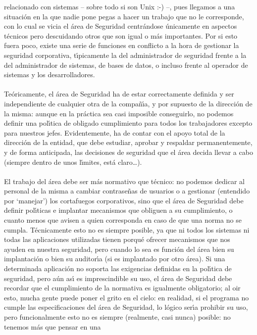 relacionado con sistemas -- sobre todo si son Unix :-) --, pues llegamos a una
situaci\'on en la que nadie pone pegas a hacer un trabajo que no le corresponde,
con lo cual se vicia el \'area de Seguridad centr\'andose \'unicamente en
aspectos t\'ecnicos pero descuidando otros que son igual o m\'as importantes.
Por si esto fuera poco, existe una serie de funciones en conflicto a la hora
de gestionar la seguridad corporativa, t\'{\i}picamente la del administrador
de seguridad frente a la del administrador de sistemas, de bases de datos, o
incluso frente al operador de sistemas y los desarrolladores.\\
\\Te\'oricamente, el \'area de Seguridad ha de estar correctamente definida y
ser independiente de 
cualquier otra de la compa\~n\'{\i}a, y por supuesto de la direcci\'on de la
misma: aunque en la pr\'actica sea casi imposible conseguirlo, no podemos 
definir una pol\'{\i}tica de obligado cumplimiento para todos los trabajadores
excepto para nuestros jefes. Evidentemente, ha de contar con el apoyo total de
la direcci\'on de la entidad, que debe estudiar, aprobar y respaldar 
permanentemente, y de forma anticipada, las decisiones de seguridad que el 
\'area decida llevar a cabo (siempre dentro de unos l\'{\i}mites, est\'a
claro\ldots).\\
\\El trabajo del \'area debe ser m\'as normativo que t\'ecnico: no podemos 
dedicar
al personal de la misma a cambiar contrase\~nas de usuarios o a gestionar
(entendido por `manejar') los cortafuegos corporativos, sino que el \'area de
Seguridad debe definir pol\'{\i}ticas e implantar mecanismos que obliguen a su
cumplimiento, o cuanto menos que avisen a quien corresponda en caso de que una
norma no se cumpla. T\'ecnicamente esto no es siempre posible, ya que ni todos
los sistemas ni todas las aplicaciones utilizadas tienen porqu\'e ofrecer 
mecanismos que nos ayuden en nuestra seguridad, pero cuando lo sea es funci\'on 
del \'area bien
su implantaci\'on o bien su auditor\'{\i}a (si es implantado por otro \'area).
Si una determinada aplicaci\'on no soporta las exigencias definidas en la
pol\'{\i}tica de seguridad, pero a\'un as\'{\i} es imprescindible su uso, el
\'area de Seguridad debe recordar que el cumplimiento de la normativa es 
igualmente obligatorio; al oir esto, mucha gente puede poner el grito en el 
cielo: en realidad, si el programa no cumple las especificaciones del \'area de
Seguridad, lo l\'ogico ser\'{\i}a prohibir su uso, pero funcionalmente esto no 
es siempre (realmente, casi nunca) posible: no tenemos m\'as que pensar en una 
